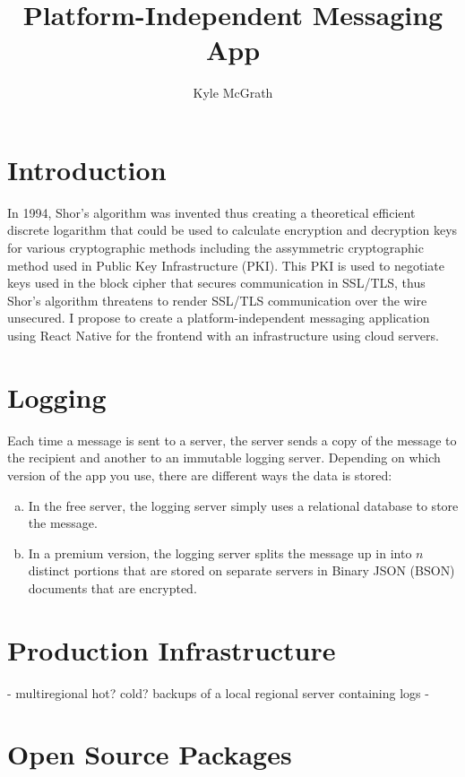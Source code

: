 \documentclass{article}
\title{Platform-Independent Messaging App}
\author{Kyle McGrath}
\begin{document}
\maketitle

\section{Introduction}
In 1994, Shor's algorithm was invented thus creating a theoretical efficient discrete logarithm that could be used to calculate encryption and decryption keys for various cryptographic methods including the assymmetric cryptographic method used in Public Key Infrastructure (PKI). This PKI is used to negotiate keys used in the block cipher that secures communication in SSL/TLS, thus Shor's algorithm threatens to render SSL/TLS communication over the wire unsecured. I propose to create a platform-independent messaging application using React Native for the frontend with an infrastructure using cloud servers.

\section{Logging}
Each time a message is sent to a server, the server sends a copy of the message to the recipient and another to an immutable logging server. Depending on which version of the app you use, there are different ways the data is stored:
\begin{enumerate}[(a)]
\item In the free server, the logging server simply uses a relational database to store the message. 
\item In a premium version, the logging server splits the message up in into $n$ distinct portions that are stored on separate servers in Binary JSON (BSON) documents that are encrypted. 
\end{enumerate}

\section{Production Infrastructure}
- multiregional hot? cold? backups of a local regional server containing logs
-

\section{Open Source Packages}
\end{document}
